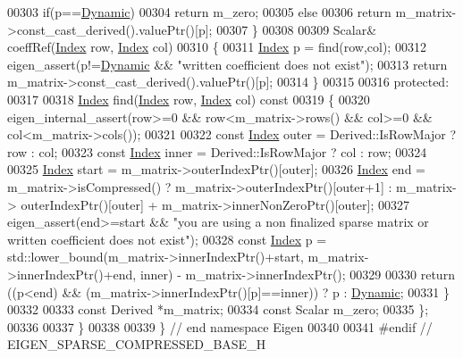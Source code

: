 \begin{DoxyCode}
00303     \textcolor{keywordflow}{if}(p==\hyperlink{namespace_eigen_ad81fa7195215a0ce30017dfac309f0b2}{Dynamic})
00304       \textcolor{keywordflow}{return} m\_zero;
00305     \textcolor{keywordflow}{else}
00306       \textcolor{keywordflow}{return} m\_matrix->const\_cast\_derived().valuePtr()[p];
00307   \}
00308 
00309   Scalar& coeffRef(\hyperlink{namespace_eigen_a62e77e0933482dafde8fe197d9a2cfde}{Index} row, \hyperlink{namespace_eigen_a62e77e0933482dafde8fe197d9a2cfde}{Index} col)
00310   \{
00311     \hyperlink{namespace_eigen_a62e77e0933482dafde8fe197d9a2cfde}{Index} p = find(row,col);
00312     eigen\_assert(p!=\hyperlink{namespace_eigen_ad81fa7195215a0ce30017dfac309f0b2}{Dynamic} && \textcolor{stringliteral}{"written coefficient does not exist"});
00313     \textcolor{keywordflow}{return} m\_matrix->const\_cast\_derived().valuePtr()[p];
00314   \}
00315 
00316 \textcolor{keyword}{protected}:
00317 
00318   \hyperlink{namespace_eigen_a62e77e0933482dafde8fe197d9a2cfde}{Index} find(\hyperlink{namespace_eigen_a62e77e0933482dafde8fe197d9a2cfde}{Index} row, \hyperlink{namespace_eigen_a62e77e0933482dafde8fe197d9a2cfde}{Index} col)\textcolor{keyword}{ const}
00319 \textcolor{keyword}{  }\{
00320     eigen\_internal\_assert(row>=0 && row<m\_matrix->rows() && col>=0 && col<m\_matrix->cols());
00321 
00322     \textcolor{keyword}{const} \hyperlink{namespace_eigen_a62e77e0933482dafde8fe197d9a2cfde}{Index} outer = Derived::IsRowMajor ? row : col;
00323     \textcolor{keyword}{const} \hyperlink{namespace_eigen_a62e77e0933482dafde8fe197d9a2cfde}{Index} inner = Derived::IsRowMajor ? col : row;
00324 
00325     \hyperlink{namespace_eigen_a62e77e0933482dafde8fe197d9a2cfde}{Index} start = m\_matrix->outerIndexPtr()[outer];
00326     \hyperlink{namespace_eigen_a62e77e0933482dafde8fe197d9a2cfde}{Index} end = m\_matrix->isCompressed() ? m\_matrix->outerIndexPtr()[outer+1] : m\_matrix->
      outerIndexPtr()[outer] + m\_matrix->innerNonZeroPtr()[outer];
00327     eigen\_assert(end>=start && \textcolor{stringliteral}{"you are using a non finalized sparse matrix or written coefficient does not
       exist"});
00328     \textcolor{keyword}{const} \hyperlink{namespace_eigen_a62e77e0933482dafde8fe197d9a2cfde}{Index} p = std::lower\_bound(m\_matrix->innerIndexPtr()+start, m\_matrix->innerIndexPtr()+end,
      inner) - m\_matrix->innerIndexPtr();
00329 
00330     \textcolor{keywordflow}{return} ((p<end) && (m\_matrix->innerIndexPtr()[p]==inner)) ? p : \hyperlink{namespace_eigen_ad81fa7195215a0ce30017dfac309f0b2}{Dynamic};
00331   \}
00332 
00333   \textcolor{keyword}{const} Derived *m\_matrix;
00334   \textcolor{keyword}{const} Scalar m\_zero;
00335 \};
00336 
00337 \}
00338 
00339 \} \textcolor{comment}{// end namespace Eigen}
00340 
00341 \textcolor{preprocessor}{#endif // EIGEN\_SPARSE\_COMPRESSED\_BASE\_H}
\end{DoxyCode}
